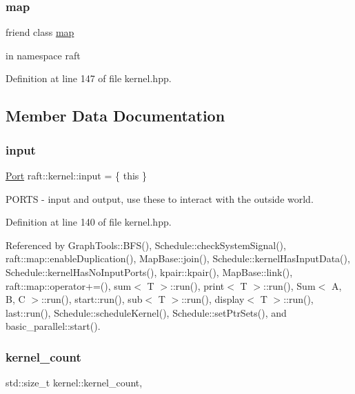 \subsubsection{\texorpdfstring{map}{map}}
{\footnotesize\ttfamily friend class \hyperlink{classraft_1_1map}{map}\hspace{0.3cm}{\ttfamily [friend]}}

in namespace raft 

Definition at line 147 of file kernel.\+hpp.



\subsection{Member Data Documentation}
\hypertarget{classraft_1_1kernel_a6edbe35a56409d402e719b3ac36d6554}{}\label{classraft_1_1kernel_a6edbe35a56409d402e719b3ac36d6554} 
\subsubsection{\texorpdfstring{input}{input}}
{\footnotesize\ttfamily \hyperlink{class_port}{Port} raft\+::kernel\+::input = \{ this \}\hspace{0.3cm}{\ttfamily [protected]}}

P\+O\+R\+TS -\/ input and output, use these to interact with the outside world. 

Definition at line 140 of file kernel.\+hpp.



Referenced by Graph\+Tools\+::\+B\+F\+S(), Schedule\+::check\+System\+Signal(), raft\+::map\+::enable\+Duplication(), Map\+Base\+::join(), Schedule\+::kernel\+Has\+Input\+Data(), Schedule\+::kernel\+Has\+No\+Input\+Ports(), kpair\+::kpair(), Map\+Base\+::link(), raft\+::map\+::operator+=(), sum$<$ T $>$\+::run(), print$<$ T $>$\+::run(), Sum$<$ A, B, C $>$\+::run(), start\+::run(), sub$<$ T $>$\+::run(), display$<$ T $>$\+::run(), last\+::run(), Schedule\+::schedule\+Kernel(), Schedule\+::set\+Ptr\+Sets(), and basic\+\_\+parallel\+::start().

\hypertarget{classraft_1_1kernel_a98e05f7418c208e28b9112e92df7eccf}{}\label{classraft_1_1kernel_a98e05f7418c208e28b9112e92df7eccf} 
\subsubsection{\texorpdfstring{kernel\+\_\+count}{kernel\_count}}
{\footnotesize\ttfamily std\+::size\+\_\+t kernel\+::kernel\+\_\+count\hspace{0.3cm}{\ttfamily [static]}, {\ttfamily [protected]}}

